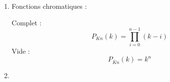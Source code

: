 \begin{enumerate}
\item Fonctions chromatiques :

Complet : \[ P_{Kn}(k)=\prod_{i=0}^{n-1}(k-i) \]
Vide : \[ P_{\overline{K}n}(k)=k^n \]
\item 
\end{enumerate}